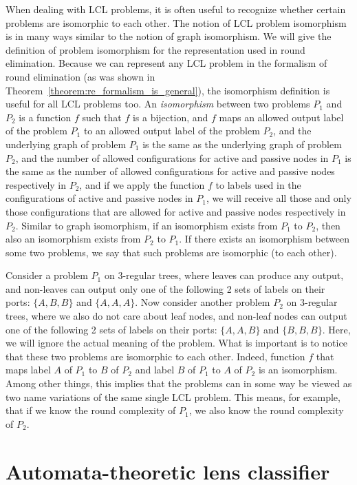 When dealing with LCL problems, it is often useful to
recognize whether certain problems are isomorphic to
each other. The notion of LCL problem isomorphism is
in many ways similar to the notion of graph isomorphism.
We will give the definition of problem isomorphism
for the representation used in round elimination.
Because we can represent any LCL problem in the formalism
of round elimination (as was
shown in Theorem~\ref{theorem:re_formalism_is_general}),
the isomorphism definition is useful
for all LCL problems too.
An \emph{isomorphism} between two problems $P_1$ and $P_2$ is
a function $f$ such that $f$ is a 
bijection, and $f$ maps an allowed output label of the problem
$P_1$ to an allowed output label of the problem $P_2$, and 
the underlying graph of problem $P_1$ is the same as the
underlying graph of problem $P_2$, and the number of
allowed configurations for active and passive nodes in $P_1$ is
the same as the number of allowed configurations for
active and passive nodes respectively in $P_2$, and if we apply the function $f$
to labels used in the configurations of active and passive nodes in
$P_1$, we will receive
all those and only those configurations that are allowed for
active and passive nodes respectively in $P_2$. Similar to graph isomorphism, if an
isomorphism exists from $P_1$ to $P_2$, then
also an isomorphism exists from $P_2$ to $P_1$. If there exists an
isomorphism between some two problems, we say that such problems
are isomorphic (to each other).

Consider a problem $P_1$ on $3$-regular trees, where leaves can
produce any output, and non-leaves can output only one of the
following 2 sets of labels on their ports: $\{A, B, B\}$ and
$\{A, A, A\}$. Now consider another problem $P_2$ on $3$-regular
trees, where we also do not care about leaf nodes, and non-leaf
nodes can output one of the following 2 sets of labels on their
ports: $\{A, A, B\}$ and $\{B, B, B\}$. Here, we will ignore
the actual meaning of the problem. What is important is to
notice that these two
problems are isomorphic to each other. Indeed, function $f$
that maps label $A$ of $P_1$ to $B$ of $P_2$ and label
$B$ of $P_1$ to $A$ of $P_2$ is an isomorphism.
Among other things, this implies that the problems can
in some way be viewed as two name variations of the same single
LCL problem. This means, for example, that if we know
the round complexity of $P_1$, we also know the round
complexity of $P_2$.

\section{Automata-theoretic lens classifier}

